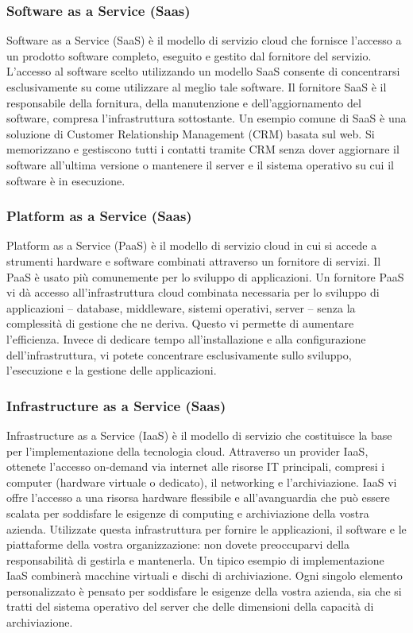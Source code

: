 \subsubsection{Software as a Service (Saas)}
Software as a Service (SaaS) è il modello di servizio cloud che fornisce l’accesso a un prodotto software completo, eseguito e gestito dal fornitore del servizio.
L’accesso al software scelto utilizzando un modello SaaS consente di concentrarsi esclusivamente su come utilizzare al meglio tale software. Il fornitore SaaS è il responsabile della fornitura, della manutenzione e dell’aggiornamento del software, compresa l’infrastruttura sottostante. Un esempio comune di SaaS è una soluzione di Customer Relationship Management (CRM) basata sul web. Si memorizzano e gestiscono tutti i contatti tramite CRM senza dover aggiornare il software all’ultima versione o mantenere il server e il sistema operativo su cui il software è in esecuzione.

\subsubsection{Platform as a Service (Saas)}
Platform as a Service (PaaS) è il modello di servizio cloud in cui si accede a strumenti hardware e software combinati attraverso un fornitore di servizi. Il PaaS è usato più comunemente per lo sviluppo di applicazioni. Un fornitore PaaS vi dà accesso all’infrastruttura cloud combinata necessaria per lo sviluppo di applicazioni – database, middleware, sistemi operativi, server – senza la complessità di gestione che ne deriva. Questo vi permette di aumentare l’efficienza. Invece di dedicare tempo all’installazione e alla configurazione dell’infrastruttura, vi potete concentrare esclusivamente sullo sviluppo, l’esecuzione e la gestione delle applicazioni.

\subsubsection{Infrastructure as a Service (Saas)}
Infrastructure as a Service (IaaS) è il modello di servizio che costituisce la base per l’implementazione della tecnologia cloud. Attraverso un provider IaaS, ottenete l’accesso on-demand via internet alle risorse IT principali, compresi i computer (hardware virtuale o dedicato), il networking e l’archiviazione. IaaS vi offre l’accesso a una risorsa hardware flessibile e all’avanguardia che può essere scalata per soddisfare le esigenze di computing e archiviazione della vostra azienda. Utilizzate questa infrastruttura per fornire le applicazioni, il software e le piattaforme della vostra organizzazione: non dovete preoccuparvi della responsabilità di gestirla e mantenerla.
Un tipico esempio di implementazione IaaS combinerà macchine virtuali e dischi di archiviazione. Ogni singolo elemento personalizzato è pensato per soddisfare le esigenze della vostra azienda, sia che si tratti del sistema operativo del server che delle dimensioni della capacità di archiviazione.

